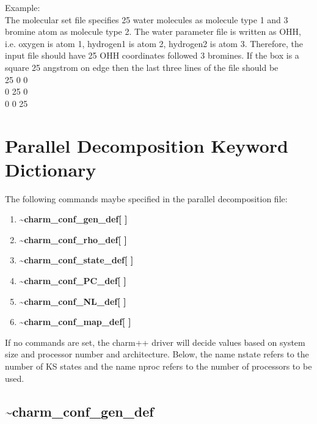 \documentclass[12pt,titlepage]{article}
\begin{document}
Example: \\ 
The molecular set file specifies 25 water molecules as molecule
type 1 and 3 bromine atom as molecule type 2. The water parameter file is 
written as OHH, i.e. oxygen is atom 1, hydrogen1 is atom 2, hydrogen2 is 
atom 3. Therefore, the input file should have 25 OHH coordinates followed
3 bromines. If the box is a square 25 angstrom on edge 
then the last three lines of the file should be \\
\hspace*{1.5in}  25  0  0  \\
\hspace*{1.5in}  0  25  0  \\
\hspace*{1.5in}  0  0   25 \\

\newpage
\section{\bf Parallel Decomposition Keyword Dictionary} 

The following commands maybe specified in the parallel decomposition file:
\begin{enumerate}
\item {\bf \~{ }charm\_conf\_gen\_def[ ]}
\item {\bf \~{ }charm\_conf\_rho\_def[ ]}
\item {\bf \~{ }charm\_conf\_state\_def[ ]}
\item {\bf \~{ }charm\_conf\_PC\_def[ ]}
\item {\bf \~{ }charm\_conf\_NL\_def[ ]}
\item {\bf \~{ }charm\_conf\_map\_def[ ]}
\end{enumerate}
If no commands are set, the charm++ driver will decide values based
on system size and processor number and architecture. Below, the 
name nstate refers to the number of KS states and the name nproc
refers to the number of processors to be used.

\newpage
\subsection*{\bf \~{ }charm\_conf\_gen\_def}
\end{document}
